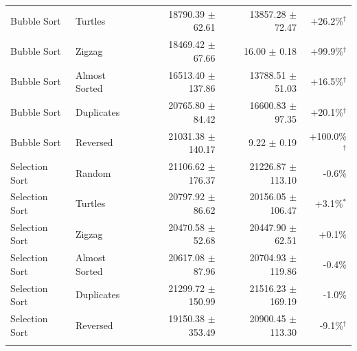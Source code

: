 \begin{tabular*}{\textwidth}{@{\extracolsep\fill}llrrr@{\extracolsep\fill}}
Bubble Sort & Turtles & 18790.39 $\pm$ 62.61 & 13857.28 $\pm$ 72.47 & +26.2\%$^{\dagger}$ \\
Bubble Sort & Zigzag & 18469.42 $\pm$ 67.66 & 16.00 $\pm$ 0.18 & +99.9\%$^{\dagger}$ \\
Bubble Sort & Almost Sorted & 16513.40 $\pm$ 137.86 & 13788.51 $\pm$ 51.03 & +16.5\%$^{\dagger}$ \\
Bubble Sort & Duplicates & 20765.80 $\pm$ 84.42 & 16600.83 $\pm$ 97.35 & +20.1\%$^{\dagger}$ \\
Bubble Sort & Reversed & 21031.38 $\pm$ 140.17 & 9.22 $\pm$ 0.19 & +100.0\%$^{\dagger}$ \\
Selection Sort & Random & 21106.62 $\pm$ 176.37 & 21226.87 $\pm$ 113.10 & -0.6\% \\
Selection Sort & Turtles & 20797.92 $\pm$ 86.62 & 20156.05 $\pm$ 106.47 & +3.1\%$^{*}$ \\
Selection Sort & Zigzag & 20470.58 $\pm$ 52.68 & 20447.90 $\pm$ 62.51 & +0.1\% \\
Selection Sort & Almost Sorted & 20617.08 $\pm$ 87.96 & 20704.93 $\pm$ 119.86 & -0.4\% \\
Selection Sort & Duplicates & 21299.72 $\pm$ 150.99 & 21516.23 $\pm$ 169.19 & -1.0\% \\
Selection Sort & Reversed & 19150.38 $\pm$ 353.49 & 20900.45 $\pm$ 113.30 & -9.1\%$^{\dagger}$ \\
\botrule
\end{tabular*}
